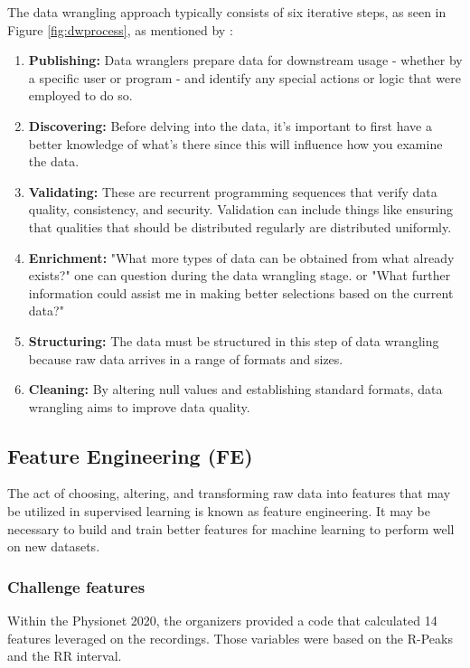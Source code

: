 The data wrangling approach typically consists of six iterative steps, as seen in Figure \ref{fig:dwprocess}, as mentioned by \cite{datawrang2}:

\begin{enumerate}
    \item \textbf{Publishing:} Data wranglers prepare data for downstream usage - whether by a specific user or program - and identify any special actions or logic that were employed to do so. 
    
    \item \textbf{Discovering:} Before delving into the data, it's important to first have a better knowledge of what's there since this will influence how you examine the data.

    \item \textbf{Validating:} These are recurrent programming sequences that verify data quality, consistency, and security. Validation can include things like ensuring that qualities that should be distributed regularly are distributed uniformly.
    
    \item \textbf{Enrichment:} "What more types of data can be obtained from what already exists?" one can question during the data wrangling stage. or "What further information could assist me in making better selections based on the current data?"
    
    \item \textbf{Structuring:} The data must be structured in this step of data wrangling because raw data arrives in a range of formats and sizes.
    
    \item \textbf{Cleaning:} By altering null values and establishing standard formats, data wrangling aims to improve data quality.
    
\end{enumerate}


\subsection{Feature Engineering (FE)} \label{4fe}

The act of choosing, altering, and transforming raw data into features that may be utilized in supervised learning is known as feature engineering. It may be necessary to build and train better features for machine learning to perform well on new datasets.

\subsubsection{Challenge features}
Within the Physionet 2020, the organizers provided a code that calculated 14 features leveraged on the recordings. Those variables were based on the R-Peaks and the RR interval.

